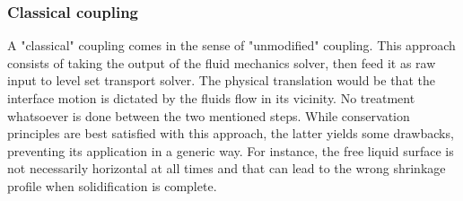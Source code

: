 \subsubsection{Classical coupling}
%
A "classical" coupling comes in the sense of "unmodified" coupling. This approach consists of taking the output of the fluid mechanics
solver, then feed it as raw input to level set transport solver. The physical translation would be that the interface motion is dictated
by the fluids flow in its vicinity. No treatment whatsoever is done between the two mentioned steps. While conservation principles are best
satisfied with this approach, the latter yields some drawbacks, preventing its application in a generic way.
For instance, the free liquid surface is not necessarily horizontal at all times and that can lead to the wrong shrinkage profile
when solidification is complete.
